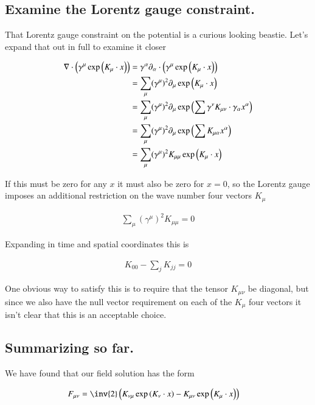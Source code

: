 \subsection{Examine the Lorentz gauge constraint. }

That Lorentz gauge constraint on the potential is a curious looking beastie.  Let's expand that out in full to examine it closer

\begin{align*}
\nabla \cdot \left(\gamma^\mu \exp\left( K_\mu \cdot x \right)\right) 
&= \gamma^\alpha \partial_\alpha \cdot \left(\gamma^\mu \exp\left( K_\mu \cdot x \right)\right)  \\
&= \sum_\mu (\gamma^\mu)^2 \partial_\mu \exp\left( K_\mu \cdot x \right) \\
&= \sum_\mu (\gamma^\mu)^2 \partial_\mu \exp\left( \sum \gamma^\nu K_{\mu\nu} \cdot \gamma_\alpha x^\alpha \right) \\
&= \sum_\mu (\gamma^\mu)^2 \partial_\mu \exp\left( \sum K_{\mu\alpha} x^\alpha \right) \\
&= \sum_\mu (\gamma^\mu)^2 K_{\mu\mu} \exp\left( K_\mu \cdot x \right)
\end{align*}

If this must be zero for any $x$ it must also be zero for $x =0$, so the Lorentz gauge imposes an additional restriction on the
wave number four vectors $K_\mu$

\begin{align*}
\sum_\mu (\gamma^\mu)^2 K_{\mu\mu} = 0 
\end{align*}

Expanding in time and spatial coordinates this is

\begin{align*}
K_{00} - \sum_j K_{jj} = 0 
\end{align*}

One obvious way to satisfy this is to require that the tensor $K_{\mu\nu}$ be diagonal, but since we also have the null vector requirement
on each of the $K_\mu$ four vectors it isn't clear that this is an acceptable choice.

\subsection{Summarizing so far. }

We have found that our field solution has the form

\begin{align}\label{eqn:em_wave:WorkingSolution}
F_{\mu\nu} &= \inv{2} \left( K_{\nu\mu} \exp\left( K_{\nu} \cdot x \right) - K_{\mu\nu} \exp\left( K_{\mu} \cdot x \right) \right)
\end{align}

